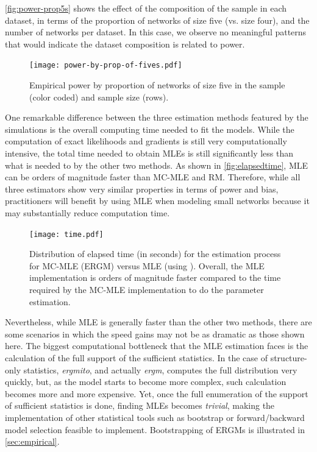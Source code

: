 \documentclass[review, nonatbib,doubleblind]{elsarticle/elsarticle}
\begin{document}
\autoref{fig:power-prop5s} shows the effect of the composition of the sample in each dataset, in terms of the proportion of networks of size five (vs. size four), and the number of networks per dataset. In this case, we observe no meaningful patterns that would indicate the dataset composition is related to power.

\begin{figure}[tb]
	\centering
	\caption{\label{fig:power-prop5s}Empirical power by proportion of networks of size five in the sample (color coded) and sample size (rows).}
	\texttt{[image: power-by-prop-of-fives.pdf]}
\end{figure}

One remarkable difference between the three estimation methods featured by the simulations is the overall computing time needed to fit the models. While the computation of exact likelihoods and gradients is still very computationally intensive, the total time needed to obtain MLEs is still  significantly less than what is needed to by the other two methods. As shown in \autoref{fig:elapsedtime}, MLE can be orders of magnitude faster than MC-MLE and RM. Therefore, while all three estimators show very similar properties in terms of power and bias, practitioners will benefit by using MLE when modeling small networks because it may substantially reduce computation time.

\begin{figure}[tb]
	\centering
	\caption{\label{fig:elapsedtime}Distribution of elapsed time (in seconds) for the estimation process for MC-MLE (ERGM) versus MLE (using \ergmito{}). Overall, the MLE implementation is orders of magnitude faster compared to the time required by the MC-MLE implementation to do the parameter estimation.}
	\texttt{[image: time.pdf]}
\end{figure}

Nevertheless, while MLE is generally faster than the other two methods, there are some scenarios in which the speed gains may not be as dramatic as those shown here. The biggest computational bottleneck that the MLE estimation faces is the calculation of the full support of the sufficient statistics. In the case of structure-only statistics, \textit{ergmito}, and actually \textit{ergm}, computes the full distribution very quickly, but, as the model starts to become more complex, such calculation becomes more and more expensive. Yet, once the full enumeration of the support of sufficient statistics is done, finding MLEs becomes \textit{trivial}, making the implementation of other statistical tools such as bootstrap or forward/backward model selection feasible to implement. Bootstrapping of ERGMs is illustrated in \autoref{sec:empirical}.
\end{document}
